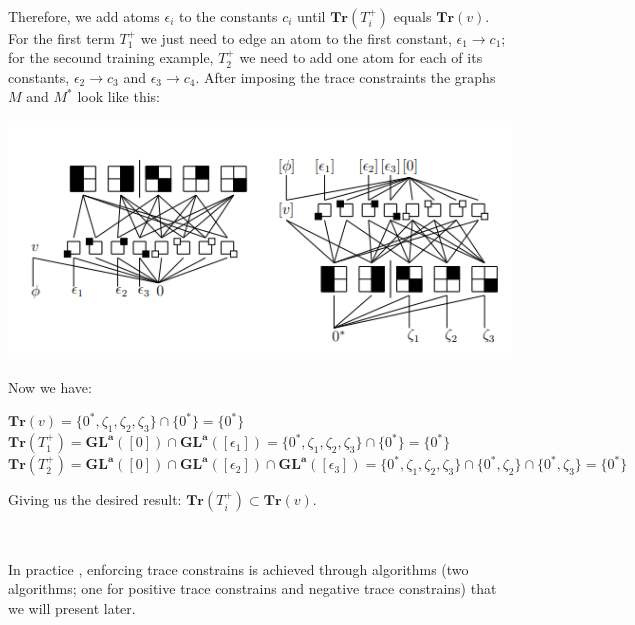 \documentclass[a4paper, 11pt]{article}
\begin{document}
\

Therefore, we add atoms $\epsilon_i$ to the constants $c_i$ until $\textbf{Tr}(T_i^+)$ equals $\textbf{Tr}(v)$. For the first term $T_1^+$ we just need to edge an atom to the first constant, $\epsilon_1 \rightarrow c_1$; for the secound training example, $T_2^+$ we need to add one atom for each of its constants, $\epsilon_2 \rightarrow c_3$ and $\epsilon_3 \rightarrow c_4$. After imposing the trace constraints the graphs $M$ and $M^{\ast}$ look like this:

\begin{center}
    \includegraphics[scale = 0.7]{afterconstrains.png}
\end{center}

Now we have:

\begin{center}
    $\textbf{Tr}(v) = \{0^{\ast}, \zeta_1, \zeta_2, \zeta_3\} \cap \{ 0^{\ast} \} = \{ 0^{\ast} \} $ \\
    $\textbf{Tr}(T_1^+) = \boldsymbol{GL}^{\boldsymbol{a}}([0]) \cap \boldsymbol{GL}^{\boldsymbol{a}}([\epsilon_1]) = \{0^{\ast}, \zeta_1, \zeta_2, \zeta_3\} \cap \{ 0^{\ast} \} = \{ 0^{\ast} \}$ \\
    $\textbf{Tr}(T_2^+) = \boldsymbol{GL}^{\boldsymbol{a}}([0]) \cap \boldsymbol{GL}^{\boldsymbol{a}}([\epsilon_2]) \cap \boldsymbol{GL}^{\boldsymbol{a}}([\epsilon_3]) = \{0^{\ast}, \zeta_1, \zeta_2, \zeta_3\} \cap \{ 0^{\ast}, \zeta_2 \} \cap \{ 0^{\ast}, \zeta_3 \} = \{ 0^{\ast} \}$
\end{center}

Giving us the desired result: $\textbf{Tr}(T_i^+) \subset \textbf{Tr}(v)$.

\

In practice , enforcing trace constrains is achieved through algorithms (two algorithms; one for positive trace constrains and negative trace constrains) that we will present later.
\end{document}

